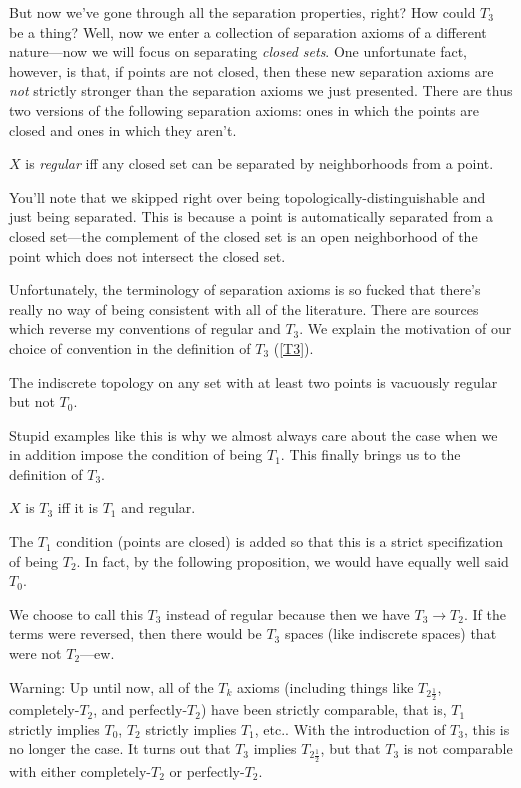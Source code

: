 But now we've gone through all the separation properties, right?  How could $T_3$ be a thing?  Well, now we enter a collection of separation axioms of a different nature---now we will focus on separating \emph{closed sets}.  One unfortunate fact, however, is that, if points are not closed, then these new separation axioms are \emph{not} strictly stronger than the separation axioms we just presented.  There are thus two versions of the following separation axioms:  ones in which the points are closed and ones in which they aren't.
\begin{dfn}[Regular]\label{Regular}
$X$ is \emph{regular} iff any closed set can be separated by neighborhoods from a point.
\begin{rmk}
You'll note that we skipped right over being topologically-distinguishable and just being separated.  This is because a point is automatically separated from a closed set---the complement of the closed set is an open neighborhood of the point which does not intersect the closed set.
\end{rmk}
\begin{rmk}
Unfortunately, the terminology of separation axioms is so fucked that there's really no way of being consistent with all of the literature.  There are sources which reverse my conventions of regular and $T_3$.  We explain the motivation of our choice of convention in the definition of $T_3$ (\cref{T3}).
\end{rmk}
\end{dfn}
\begin{exm}
The indiscrete topology on any set with at least two points is vacuously regular but not $T_0$.
\end{exm}
Stupid examples like this is why we almost always care about the case when we in addition impose the condition of being $T_1$.  This finally brings us to the definition of $T_3$.
\begin{dfn}[$T_3$]\label{T3}
$X$ is $T_3$ iff it is $T_1$ and regular.
\begin{rmk}
The $T_1$ condition (points are closed) is added so that this is a strict specifization of being $T_2$.  In fact, by the following proposition, we would have equally well said $T_0$.
\end{rmk}
\begin{rmk}
We choose to call this $T_3$ instead of regular because then we have $T_3\rightarrow T_2$.  If the terms were reversed, then there would be $T_3$ spaces (like indiscrete spaces) that were not $T_2$---ew.
\end{rmk}
\begin{rmk}
Warning:  Up until now, all of the $T_k$ axioms (including things like $T_{2\frac{1}{2}}$, completely-$T_2$, and perfectly-$T_2$) have been strictly comparable, that is, $T_1$ strictly implies $T_0$, $T_2$ strictly implies $T_1$, etc..  With the introduction of $T_3$, this is no longer the case.  It turns out that $T_3$ implies $T_{2\frac{1}{2}}$, but that $T_3$ is not comparable with either completely-$T_2$ or perfectly-$T_2$.
\end{rmk}
\end{dfn}
